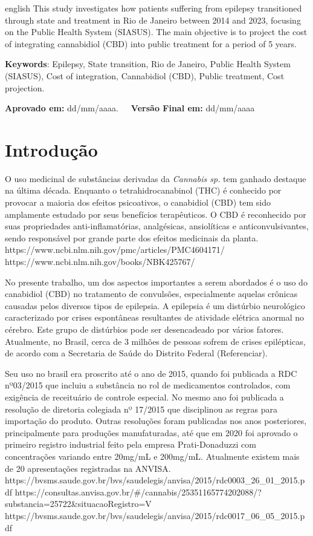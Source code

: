 \documentclass[article,a4paper,12pt,brazil,sumario=tradicional]{abntex2}
\begin{document}
\vspace{-.3cm}
\begin{hyphenrules}{english}
\noindent This study investigates how patients suffering from epilepsy transitioned through state and treatment in Rio de Janeiro between 2014 and 2023, focusing on the Public Health System (SIASUS). The main objective is to project the cost of integrating cannabidiol (CBD) into public treatment for a period of 5 years.
\end{hyphenrules}
\vspace{.4cm}
 
\noindent \textbf{Keywords}: Epilepsy, State transition, Rio de Janeiro, Public Health System (SIASUS), Cost of integration, Cannabidiol (CBD), Public treatment, Cost projection.

\vspace{.4cm}

\noindent \textbf{Aprovado em:} dd/mm/aaaa.~~~\textbf{Versão Final em:} dd/mm/aaaa

\section{Introdução}

O uso medicinal de substâncias derivadas da \textit{Cannabis sp.} tem ganhado destaque na última década. Enquanto o tetrahidrocanabinol (THC) é conhecido por provocar a maioria dos efeitos psicoativos, o canabidiol (CBD) tem sido amplamente estudado por seus benefícios terapêuticos. O CBD é reconhecido por suas propriedades anti-inflamatórias, analgésicas, ansiolíticas e anticonvulsivantes, sendo responsável por grande parte dos efeitos medicinais da planta.
https://www.ncbi.nlm.nih.gov/pmc/articles/PMC4604171/
https://www.ncbi.nlm.nih.gov/books/NBK425767/

No presente trabalho, um dos aspectos importantes a serem abordados é o uso do canabidiol (CBD) no tratamento de convulsões, especialmente aquelas crônicas causadas pelos diversos tipos de epilepsia. A epilepsia é um distúrbio neurológico caracterizado por crises espontâneas resultantes de atividade elétrica anormal no cérebro. Este grupo de distúrbios pode ser desencadeado por vários fatores. Atualmente, no Brasil, cerca de 3 milhões de pessoas sofrem de crises epilépticas, de acordo com a Secretaria de Saúde do Distrito Federal (Referenciar).

Seu uso no brasil era proscrito até o ano de 2015, quando foi publicada a RDC nº03/2015 que incluiu a substância no rol de medicamentos controlados, com exigência de receituário de controle especial. No mesmo ano foi publicada a resolução de diretoria colegiada nº 17/2015 que disciplinou as regras para importação do produto. Outras resoluções foram publicadas nos anos posteriores, principalmente para produções manufaturadas, até que em 2020 foi aprovado o primeiro registro industrial feito pela empresa Prati-Donaduzzi com concentrações variando entre 20mg/mL e 200mg/mL. Atualmente existem mais de 20 apresentações registradas na ANVISA.
https://bvsms.saude.gov.br/bvs/saudelegis/anvisa/2015/rdc0003_26_01_2015.pdf
https://consultas.anvisa.gov.br/#/cannabis/25351165774202088/?substancia=25722&situacaoRegistro=V
https://bvsms.saude.gov.br/bvs/saudelegis/anvisa/2015/rdc0017_06_05_2015.pdf
\end{document}
